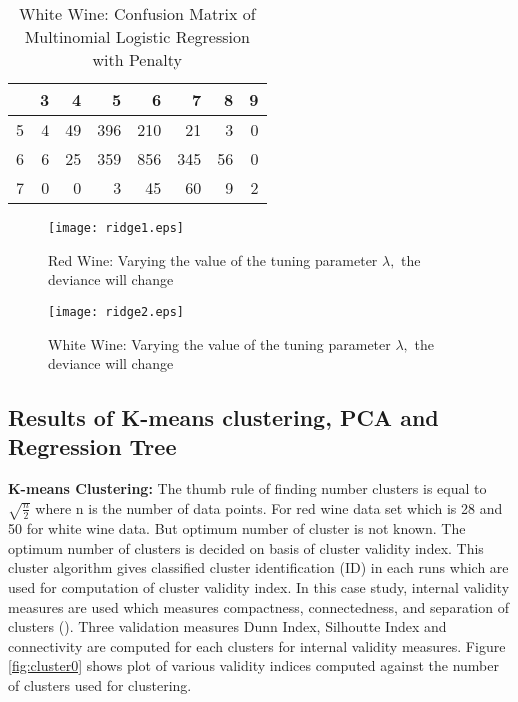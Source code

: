 \documentclass[12pt]{article}
\begin{document}
\begin{center}
\begin{table}[htbp]
\centering
\begin{tabular}{rrrrrrrr}
  \hline
 & 3 & 4 & 5 & 6 & 7 & 8 & 9 \\
  \hline
5 &   4 &  49 & 396 & 210 &  21 &   3 &   0 \\
  6 &   6 &  25 & 359 & 856 & 345 &  56 &   0 \\
  7 &   0 &   0 &   3 &  45 &  60 &   9 &   2 \\
   \hline
\end{tabular}
\caption{White Wine: Confusion Matrix of Multinomial Logistic Regression with Penalty}
\label{tab:ridge2}
\end{table}\end{center}

\begin{figure} [htbp]
 \begin{center}
\texttt{[image: ridge1.eps]}
\caption{Red Wine: Varying the value of the tuning parameter $\lambda,$ the deviance will change}
 \label{fig:ridge1}
\end{center}
\end{figure}


\begin{figure} [htbp]
 \begin{center}
\texttt{[image: ridge2.eps]}
\caption{White Wine: Varying the value of the tuning parameter $\lambda,$ the deviance will change}
 \label{fig:ridge2}
\end{center}
\end{figure}


\subsection{Results of K-means clustering, PCA and Regression Tree}
\textbf{K-means Clustering:} The thumb rule of finding number clusters is equal to $\sqrt{\frac{n}{2}}$  where n is
the number of data points. For red wine data set which is 28 and 50 for white wine data. But
optimum number of cluster is not known. The optimum number of clusters is decided on
basis of cluster validity index. This cluster algorithm gives classified cluster identification (ID) in
each runs which are used for computation of cluster validity index. In this case study, internal validity measures are used which measures
compactness, connectedness, and separation of clusters (\cite{Brock}). Three validation measures Dunn Index, Silhoutte Index
and connectivity are computed for each clusters for internal validity measures. Figure \ref{fig:cluster0} shows
plot of
various validity indices computed against the number of clusters used for clustering.
\end{document}
